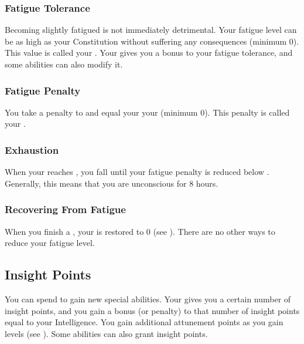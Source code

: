             \subsubsection{Fatigue Tolerance}\label{Fatigue Tolerance}
                Becoming slightly fatigued is not immediately detrimental.
                Your fatigue level can be as high as your Constitution without suffering any consequences (minimum 0).
                This value is called your .
                Your  gives you a bonus to your fatigue tolerance, and some abilities can also modify it.

            \subsubsection{Fatigue Penalty}\label{Fatigue Penalty}
                You take a penalty to  and  equal your  \sub your  (minimum 0).
                This penalty is called your .

        \subsubsection{Exhaustion}\label{Exhaustion}
            When your  reaches , you fall \unconscious until your fatigue penalty is reduced below .
            Generally, this means that you are unconscious for 8 hours.

        \subsubsection{Recovering From Fatigue}
            When you finish a , your  is restored to 0 (see ).
            There are no other ways to reduce your fatigue level.

    \subsection{Insight Points}\label{Insight Points}
        You can spend  to gain new special abilities.
        Your  gives you a certain number of insight points, and you gain a bonus (or penalty) to that number of insight points equal to your Intelligence.
        You gain additional attunement points as you gain levels (see ).
        Some abilities can also grant insight points.
        
